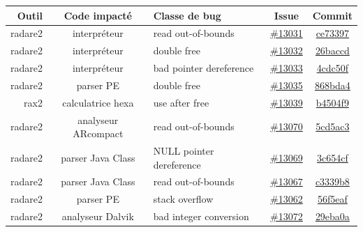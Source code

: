 \begin{tabularx}{\textwidth}{|r|c|X|c|c|}
    \hline
    \textbf{Outil} & \textbf{Code impacté} & \textbf{Classe de bug} & \textbf{Issue} & \textbf{Commit} \\
    \hline
    radare2 & interpréteur & read out-of-bounds & \href{https://github.com/radare/radare2/issues/13031}{\#13031} & \href{https://github.com/radare/radare2/commit/ce73397}{ce73397} \\
    \hline
    radare2 & interpréteur & double free & \href{https://github.com/radare/radare2/issues/13032}{\#13032} & \href{https://github.com/radare/radare2/commit/26baccd}{26baccd} \\
    \hline
    radare2 & interpréteur & bad pointer dereference & \href{https://github.com/radare/radare2/issues/13033}{\#13033} & \href{https://github.com/radare/radare2/commit/4cdc50f}{4cdc50f} \\
    \hline
    radare2 & parser PE & double free & \href{https://github.com/radare/radare2/issues/13035}{\#13035} & \href{https://github.com/radare/radare2/commit/868bda4}{868bda4} \\
    \hline
    rax2 & calculatrice hexa & use after free & \href{https://github.com/radare/radare2/issues/13039}{\#13039} & \href{https://github.com/radare/radare2/commit/b4504f9}{b4504f9} \\
    \hline
    radare2 & analyseur ARcompact & read out-of-bounds & \href{https://github.com/radare/radare2/issues/13070}{\#13070} & \href{https://github.com/radare/radare2/commit/5cd5ac3}{5cd5ac3} \\
    \hline
    radare2 & parser Java Class & NULL pointer dereference & \href{https://github.com/radare/radare2/issues/13069}{\#13069} & \href{https://github.com/radare/radare2/commit/3c654cf}{3c654cf} \\
    \hline
    radare2 & parser Java Class & read out-of-bounds & \href{https://github.com/radare/radare2/issues/13067}{\#13067} & \href{https://github.com/radare/radare2/commit/c3339b8}{c3339b8} \\
    \hline
    radare2 & parser PE & stack overflow & \href{https://github.com/radare/radare2/issues/13062}{\#13062} & \href{https://github.com/radare/radare2/commit/56f5eaf}{56f5eaf} \\
    \hline
    radare2 & analyseur Dalvik & bad integer conversion & \href{https://github.com/radare/radare2/issues/13072}{\#13072} & \href{https://github.com/radare/radare2/commit/29eba0a}{29eba0a} \\
    \hline

\end{tabularx}
